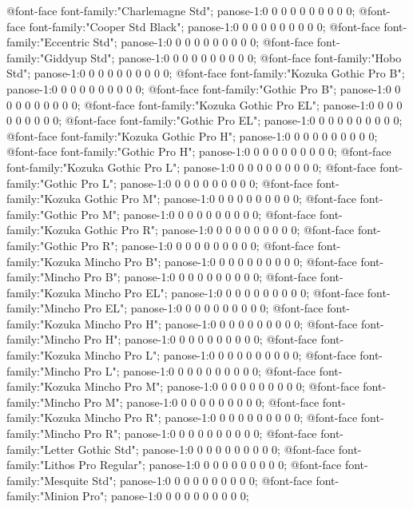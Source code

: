 @font-face
	{font-family:"Charlemagne Std";
	panose-1:0 0 0 0 0 0 0 0 0 0;}
@font-face
	{font-family:"Cooper Std Black";
	panose-1:0 0 0 0 0 0 0 0 0 0;}
@font-face
	{font-family:"Eccentric Std";
	panose-1:0 0 0 0 0 0 0 0 0 0;}
@font-face
	{font-family:"Giddyup Std";
	panose-1:0 0 0 0 0 0 0 0 0 0;}
@font-face
	{font-family:"Hobo Std";
	panose-1:0 0 0 0 0 0 0 0 0 0;}
@font-face
	{font-family:"Kozuka Gothic Pro B";
	panose-1:0 0 0 0 0 0 0 0 0 0;}
@font-face
	{font-family:"\@Kozuka Gothic Pro B";
	panose-1:0 0 0 0 0 0 0 0 0 0;}
@font-face
	{font-family:"Kozuka Gothic Pro EL";
	panose-1:0 0 0 0 0 0 0 0 0 0;}
@font-face
	{font-family:"\@Kozuka Gothic Pro EL";
	panose-1:0 0 0 0 0 0 0 0 0 0;}
@font-face
	{font-family:"Kozuka Gothic Pro H";
	panose-1:0 0 0 0 0 0 0 0 0 0;}
@font-face
	{font-family:"\@Kozuka Gothic Pro H";
	panose-1:0 0 0 0 0 0 0 0 0 0;}
@font-face
	{font-family:"Kozuka Gothic Pro L";
	panose-1:0 0 0 0 0 0 0 0 0 0;}
@font-face
	{font-family:"\@Kozuka Gothic Pro L";
	panose-1:0 0 0 0 0 0 0 0 0 0;}
@font-face
	{font-family:"Kozuka Gothic Pro M";
	panose-1:0 0 0 0 0 0 0 0 0 0;}
@font-face
	{font-family:"\@Kozuka Gothic Pro M";
	panose-1:0 0 0 0 0 0 0 0 0 0;}
@font-face
	{font-family:"Kozuka Gothic Pro R";
	panose-1:0 0 0 0 0 0 0 0 0 0;}
@font-face
	{font-family:"\@Kozuka Gothic Pro R";
	panose-1:0 0 0 0 0 0 0 0 0 0;}
@font-face
	{font-family:"Kozuka Mincho Pro B";
	panose-1:0 0 0 0 0 0 0 0 0 0;}
@font-face
	{font-family:"\@Kozuka Mincho Pro B";
	panose-1:0 0 0 0 0 0 0 0 0 0;}
@font-face
	{font-family:"Kozuka Mincho Pro EL";
	panose-1:0 0 0 0 0 0 0 0 0 0;}
@font-face
	{font-family:"\@Kozuka Mincho Pro EL";
	panose-1:0 0 0 0 0 0 0 0 0 0;}
@font-face
	{font-family:"Kozuka Mincho Pro H";
	panose-1:0 0 0 0 0 0 0 0 0 0;}
@font-face
	{font-family:"\@Kozuka Mincho Pro H";
	panose-1:0 0 0 0 0 0 0 0 0 0;}
@font-face
	{font-family:"Kozuka Mincho Pro L";
	panose-1:0 0 0 0 0 0 0 0 0 0;}
@font-face
	{font-family:"\@Kozuka Mincho Pro L";
	panose-1:0 0 0 0 0 0 0 0 0 0;}
@font-face
	{font-family:"Kozuka Mincho Pro M";
	panose-1:0 0 0 0 0 0 0 0 0 0;}
@font-face
	{font-family:"\@Kozuka Mincho Pro M";
	panose-1:0 0 0 0 0 0 0 0 0 0;}
@font-face
	{font-family:"Kozuka Mincho Pro R";
	panose-1:0 0 0 0 0 0 0 0 0 0;}
@font-face
	{font-family:"\@Kozuka Mincho Pro R";
	panose-1:0 0 0 0 0 0 0 0 0 0;}
@font-face
	{font-family:"Letter Gothic Std";
	panose-1:0 0 0 0 0 0 0 0 0 0;}
@font-face
	{font-family:"Lithos Pro Regular";
	panose-1:0 0 0 0 0 0 0 0 0 0;}
@font-face
	{font-family:"Mesquite Std";
	panose-1:0 0 0 0 0 0 0 0 0 0;}
@font-face
	{font-family:"Minion Pro";
	panose-1:0 0 0 0 0 0 0 0 0 0;}
